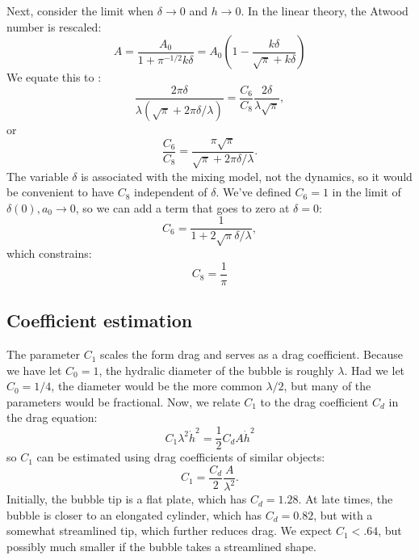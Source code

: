 Next, consider the limit when $\delta \rightarrow 0 $ and $h \rightarrow 0$.
In the linear theory, the Atwood number is rescaled:
\begin{equation}
A = \frac{A_0}{1 + \pi^{-1/2} k \delta} = A_0 \left(1 - \frac{k \delta}{\sqrt{\pi} + k \delta}\right)
\end{equation}
We equate this to :
\begin{equation}
\frac{2 \pi \delta}{\lambda (\sqrt{\pi} + 2 \pi \delta / \lambda)} = \frac{C_6 }{C_8}\frac{2 \delta}{\lambda \sqrt{\pi} },
\end{equation}
or
\begin{equation}
\frac{C_6}{C_8} = \frac{\pi \sqrt{\pi}}{\sqrt{\pi} + 2 \pi \delta / \lambda}.
\end{equation}
The variable $\delta$ is associated with the mixing model, not the dynamics, so it would be convenient to have $C_8$ independent of $\delta$.
We've defined $C_6 = 1$ in the limit of $\delta(0), a_0 \rightarrow 0$, so we can add a term that goes to zero at $\delta = 0$:
\begin{equation}
C_6 = \frac{1}{1 + 2 \sqrt{\pi} \delta / \lambda},
\end{equation}
which constrains:
\begin{equation}
C_8 = \frac{1}{\pi}
\end{equation}

\subsection{Coefficient estimation}

The parameter $C_1$ scales the form drag and serves as a drag coefficient.  
Because we have let $C_0 = 1$, the hydralic diameter of the bubble is roughly $\lambda$.
Had we let $C_0 = 1/4$, the diameter would be the more common $\lambda/2$, but many of the parameters would be fractional.
Now, we relate $C_1$ to the drag coefficient $C_d$ in the drag equation:
\begin{equation}
C_1 \lambda^2 \dot{h}^2 = \frac{1}{2} C_d A \dot{h}^2
\end{equation}
so $C_1$ can be estimated using drag coefficients of similar objects:
\begin{equation}
C_1 = \frac{C_d}{2} \frac{A}{\lambda^2}.
\end{equation}
Initially, the bubble tip is a flat plate, which has $C_d = 1.28$.
At late times, the bubble is closer to an elongated cylinder, which has $C_d = 0.82$, but with a somewhat streamlined tip, which further reduces drag.
We expect $C_1 < .64$, but possibly much smaller if the bubble takes a streamlined shape.

